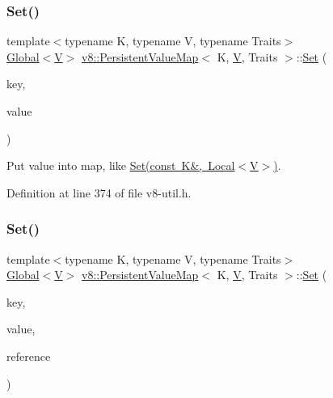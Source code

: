 \subsubsection{\texorpdfstring{Set()}{Set()}\hspace{0.1cm}{\footnotesize\ttfamily [2/3]}}
{\footnotesize\ttfamily template$<$typename K, typename V, typename Traits$>$ \\
\mbox{\hyperlink{classv8_1_1Global}{Global}}$<$\mbox{\hyperlink{classV}{V}}$>$ \mbox{\hyperlink{classv8_1_1PersistentValueMap}{v8\+::\+Persistent\+Value\+Map}}$<$ K, \mbox{\hyperlink{classV}{V}}, Traits $>$\+::\mbox{\hyperlink{classv8_1_1Set}{Set}} (\begin{DoxyParamCaption}\item[{const K \&}]{key,  }\item[{\mbox{\hyperlink{classv8_1_1Global}{Global}}$<$ \mbox{\hyperlink{classV}{V}} $>$}]{value }\end{DoxyParamCaption})\hspace{0.3cm}{\ttfamily [inline]}}

Put value into map, like \mbox{\hyperlink{classv8_1_1PersistentValueMap_a4527a2e1b25a9f1772317f948382d9f9}{Set(const K\&, Local$<$\+V$>$)}}. 

Definition at line 374 of file v8-\/util.\+h.

\mbox{\label{classv8_1_1PersistentValueMap_a8128f8cff6ed0f3177e966b28cc081ba}} 
\subsubsection{\texorpdfstring{Set()}{Set()}\hspace{0.1cm}{\footnotesize\ttfamily [3/3]}}
{\footnotesize\ttfamily template$<$typename K, typename V, typename Traits$>$ \\
\mbox{\hyperlink{classv8_1_1Global}{Global}}$<$\mbox{\hyperlink{classV}{V}}$>$ \mbox{\hyperlink{classv8_1_1PersistentValueMap}{v8\+::\+Persistent\+Value\+Map}}$<$ K, \mbox{\hyperlink{classV}{V}}, Traits $>$\+::\mbox{\hyperlink{classv8_1_1Set}{Set}} (\begin{DoxyParamCaption}\item[{const K \&}]{key,  }\item[{\mbox{\hyperlink{classv8_1_1Global}{Global}}$<$ \mbox{\hyperlink{classV}{V}} $>$}]{value,  }\item[{\mbox{\hyperlink{classv8_1_1PersistentValueMapBase_1_1PersistentValueReference}{Persistent\+Value\+Reference}} $\ast$}]{reference }\end{DoxyParamCaption})\hspace{0.3cm}{\ttfamily [inline]}}


